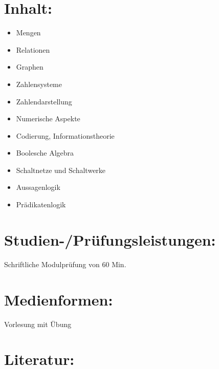 \section*{Inhalt:}\label{inhalt-23}

\begin{itemize}
\tightlist
\item
  Mengen
\item
  Relationen
\item
  Graphen
\item
  Zahlensysteme
\item
  Zahlendarstellung
\item
  Numerische Aspekte
\item
  Codierung, Informationstheorie
\item
  Boolesche Algebra
\item
  Schaltnetze und Schaltwerke
\item
  Aussagenlogik
\item
  Prädikatenlogik
\end{itemize}

\section*{Studien-/Prüfungsleistungen:}\label{studien-pruxfcfungsleistungen-21}

Schriftliche Modulprüfung von 60 Min.

\section*{Medienformen:}\label{medienformen-14}

Vorlesung mit Übung

\section*{Literatur:}\label{literatur-19}

